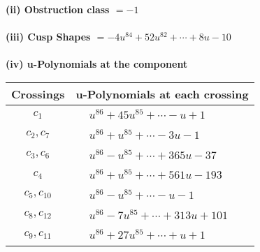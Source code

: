 \documentclass[1p]{elsarticle_modified}
\theoremstyle{definition}
\begin{document}
\flushleft \textbf{(ii) Obstruction class $= -1$}\\~\\
\flushleft \textbf{(iii) Cusp Shapes $= -4 u^{84}+52 u^{82}+\cdots+8 u-10$}\\~\\
\newpage\renewcommand{\arraystretch}{1}
\flushleft \textbf{(iv) u-Polynomials at the component}\newline \\
\begin{tabular}{m{50pt}|m{274pt}}
Crossings & \hspace{64pt}u-Polynomials at each crossing \\
\hline $$\begin{aligned}c_{1}\end{aligned}$$&$\begin{aligned}
&u^{86}+45 u^{85}+\cdots- u+1
\end{aligned}$\\
\hline $$\begin{aligned}c_{2},c_{7}\end{aligned}$$&$\begin{aligned}
&u^{86}+u^{85}+\cdots-3 u-1
\end{aligned}$\\
\hline $$\begin{aligned}c_{3},c_{6}\end{aligned}$$&$\begin{aligned}
&u^{86}- u^{85}+\cdots+365 u-37
\end{aligned}$\\
\hline $$\begin{aligned}c_{4}\end{aligned}$$&$\begin{aligned}
&u^{86}+u^{85}+\cdots+561 u-193
\end{aligned}$\\
\hline $$\begin{aligned}c_{5},c_{10}\end{aligned}$$&$\begin{aligned}
&u^{86}- u^{85}+\cdots- u-1
\end{aligned}$\\
\hline $$\begin{aligned}c_{8},c_{12}\end{aligned}$$&$\begin{aligned}
&u^{86}-7 u^{85}+\cdots+313 u+101
\end{aligned}$\\
\hline $$\begin{aligned}c_{9},c_{11}\end{aligned}$$&$\begin{aligned}
&u^{86}+27 u^{85}+\cdots+u+1
\end{aligned}$\\
\hline
\end{tabular}\\~\\
\end{document}

